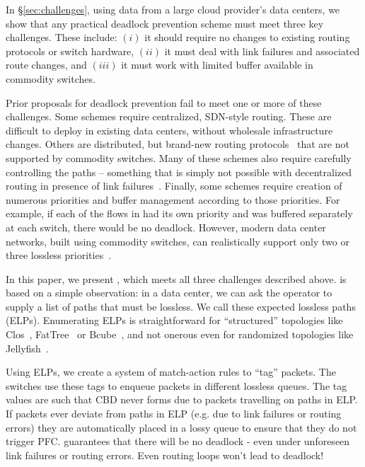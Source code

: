 In \S\ref{sec:challenges}, using data from a large cloud provider's data
centers, we show that any practical deadlock prevention scheme must meet three
key challenges. These include: $(i)$ it should require no changes to existing
routing protocols or switch hardware, $(ii)$ it must deal with link failures and
associated  route changes, and $(iii)$ it must work with limited buffer
available in commodity switches.

Prior proposals for deadlock prevention fail to meet one or more of these
challenges.  Some schemes require centralized, SDN-style routing.  These are
difficult to deploy in existing data centers, without wholesale infrastructure
changes.  Others are distributed, but brand-new routing protocols~\cite{tcpbolt}
that are not supported by commodity switches.  Many of these schemes also
require carefully controlling the paths -- something that is simply not possible
with decentralized routing in presence of link failures~\cite{netpilot}.
Finally, some schemes require creation of numerous priorities and buffer
management according to those priorities. For example, if each of the flows in
had its own priority and was buffered
separately at each switch, there would be no deadlock.  However, modern data
center networks, built using commodity switches, can realistically support only
two or three lossless priorities~\cite{rdmaatscale}.

In this paper, we present \sysname{}, which meets all three challenges described
above. \sysname{} is based on a simple observation: in a data center, we can ask
the operator to supply a list of paths that must be lossless.
We call these expected lossless paths (ELPs). Enumerating ELPs is
straightforward for ``structured'' topologies like Clos~\cite{clos},
FatTree~\cite{fattree} or Bcube~\cite{bcube}, and not onerous even for
randomized topologies like Jellyfish~\cite{jellyfish}.

Using ELPs, we create a system of match-action rules to ``tag'' packets. The
switches use these tags to enqueue packets in different lossless queues. The tag
values are such that CBD never forms due to packets travelling on paths in ELP.
If packets ever deviate from paths in ELP (e.g. due to link failures or routing
errors) they are automatically placed in a lossy queue to ensure that they do
not trigger PFC. \sysname{} guarantees that there will be no deadlock - even under
unforeseen link failures or routing errors. Even routing loops won't lead to
deadlock!

